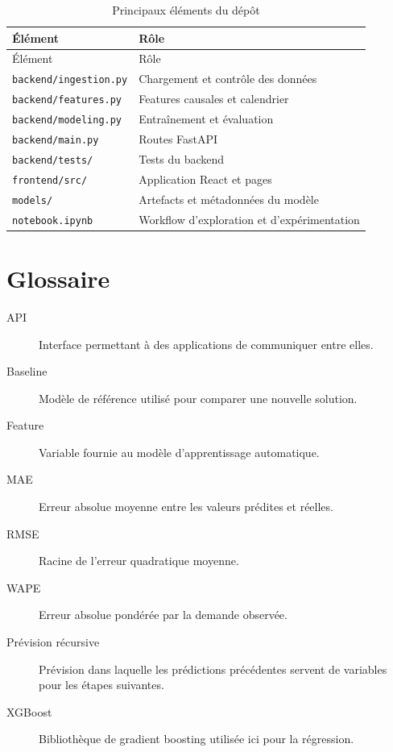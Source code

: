 \documentclass[12pt,a4paper]{report}
\begin{document}
\begin{longtable}{p{} p{}}
\caption{Principaux éléments du dépôt}\label{tab:structure-depot}\\
\toprule
Élément & Rôle \\
\midrule
\endfirsthead
\toprule
Élément & Rôle \\
\midrule
\endhead
\texttt{backend/ingestion.py} & Chargement et contrôle des données \\
\texttt{backend/features.py} & Features causales et calendrier \\
\texttt{backend/modeling.py} & Entraînement et évaluation \\
\texttt{backend/main.py} & Routes FastAPI \\
\texttt{backend/tests/} & Tests du backend \\
\texttt{frontend/src/} & Application React et pages \\
\texttt{models/} & Artefacts et métadonnées du modèle \\
\texttt{notebook.ipynb} & Workflow d'exploration et d'expérimentation \\
\bottomrule
\end{longtable}

\chapter{Glossaire}

\begin{description}
	\item[API] Interface permettant à des applications de communiquer entre elles.
	\item[Baseline] Modèle de référence utilisé pour comparer une nouvelle solution.
	\item[Feature] Variable fournie au modèle d'apprentissage automatique.
	\item[MAE] Erreur absolue moyenne entre les valeurs prédites et réelles.
	\item[RMSE] Racine de l'erreur quadratique moyenne.
	\item[WAPE] Erreur absolue pondérée par la demande observée.
	\item[Prévision récursive] Prévision dans laquelle les prédictions précédentes
	servent de variables pour les étapes suivantes.
	\item[XGBoost] Bibliothèque de gradient boosting utilisée ici pour la régression.
\end{description}
\end{document}
